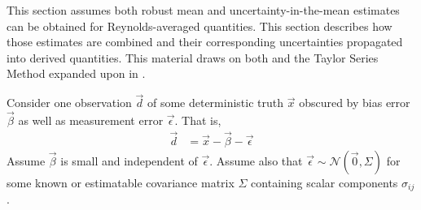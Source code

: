 \documentclass[letterpaper,11pt,nointlimits,reqno,draft]{amsbook}
\begin{document}
This section assumes both robust mean and uncertainty-in-the-mean estimates can
be obtained for Reynolds-averaged quantities.  This section describes how those
estimates are combined and their corresponding uncertainties propagated into
derived quantities.  This material draws on both \citet{Ku1966Notes} and the
Taylor Series Method expanded upon in \citet{Coleman2009Experimentation}.

Consider one observation $\vec{d}$  of some deterministic truth $\vec{x}$
obscured by bias error $\vec{\beta}$ as well as measurement error
$\vec{\epsilon}$. That is,
\begin{align*}
  \vec{d} &= \vec{x} - \vec{\beta} - \vec{\epsilon}
\end{align*}
Assume $\vec{\beta}$ is small and independent of $\vec{\epsilon}$.  Assume also
that $\vec{\epsilon} \sim \mathcal{N}(\vec{0}, \Sigma)$ for some known or
estimatable covariance matrix $\Sigma$ containing scalar components
$\sigma_{ij}$.
\end{document}
